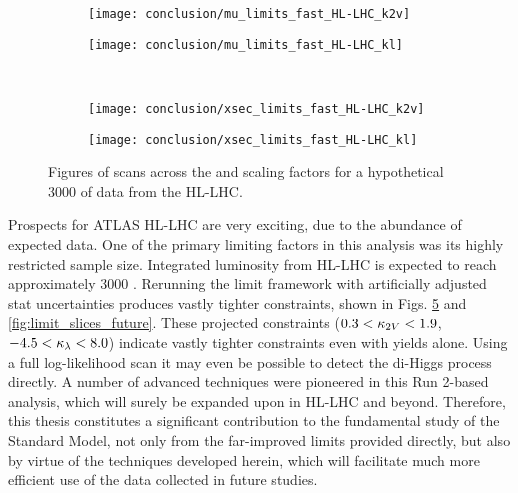 \begin{figure}
    \centering
    \begin{subfigure}{0.48\textwidth} 
        \texttt{[image: conclusion/mu\_limits\_fast\_HL-LHC\_k2v]}
        \caption{}%
        \label{fig:mulimits_kvv_future}
    \end{subfigure}
    \begin{subfigure}{0.48\textwidth}
        \texttt{[image: conclusion/mu\_limits\_fast\_HL-LHC\_kl]}
        \caption{}%
        \label{fig:mulimits_kl_future}
    \end{subfigure}\\
    \begin{subfigure}{0.48\textwidth} 
        \texttt{[image: conclusion/xsec\_limits\_fast\_HL-LHC\_k2v]}
        \caption{}%
        \label{fig:xseclimits_kvv_future}
    \end{subfigure}
    \begin{subfigure}{0.48\textwidth}
        \texttt{[image: conclusion/xsec\_limits\_fast\_HL-LHC\_kl]}
        \caption{}%
        \label{fig:xseclimits_kl_future}
    \end{subfigure}
    \caption{
        Figures of scans across the \kvv and \kl scaling factors
            for a hypothetical 3000 \ifb of data from the HL-LHC.
    }
    \label{fig:mu_xsec_future}
\end{figure}

Prospects for ATLAS HL-LHC are very exciting, due to the abundance of expected data.
One of the primary limiting factors in this analysis was its highly restricted sample size.
Integrated luminosity from HL-LHC is expected to reach approximately 3000 \ifb.
Rerunning the limit framework with artificially adjusted stat uncertainties produces vastly tighter constraints,
    shown in Figs. \ref{fig:mu_xsec_future} and \ref{fig:limit_slices_future}.
These projected constraints 
    ($0.3<\kappa_{2V}<1.9$, $-4.5<\kappa_{\lambda}<8.0$)
    indicate vastly tighter constraints even with yields alone.
Using a full log-likelihood scan it may even be possible to detect the di-Higgs process directly.
A number of advanced techniques were pioneered in this Run 2-based analysis,
    which will surely be expanded upon in HL-LHC and beyond.
Therefore, this thesis constitutes a significant contribution to the fundamental study of the Standard Model,
    not only from the far-improved limits provided directly,
    but also by virtue of the techniques developed herein,
    which will facilitate much more efficient use of the data collected in future studies.


